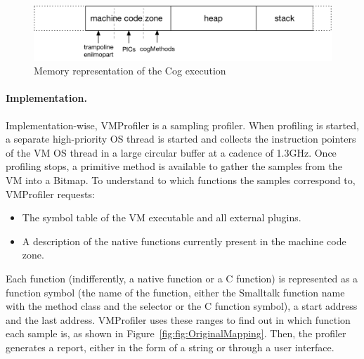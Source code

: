 \documentclass[10pt,preprint,nonatbib]{sigplanconf}
\newcommand{\figref}[1]{Figure~\ref{fig:#1}}
\begin{document}
 \begin{figure}[!htp]
     \begin{center}
         \includegraphics[width=1\linewidth]{CogMemory}
         \caption{Memory representation of the Cog execution}
         \label{fig:CogMemory}
     \end{center}
 \end{figure}

\paragraph{Implementation.} Implementation-wise, VMProfiler is a sampling profiler. When profiling is started, a separate high-priority OS thread is started and collects the instruction pointers of the VM OS thread in a large circular buffer at a cadence of 1.3GHz. Once profiling stops, a primitive method is available to gather the samples from the VM into a Bitmap. To understand to which functions the samples correspond to, VMProfiler requests:
\begin{itemize}
	\item The symbol table of the VM executable and all external plugins.
	\item A description of the native functions currently present in the machine code zone.
\end{itemize}
Each function (indifferently, a native function or a C function) is represented as a function symbol (the name of the function, either the Smalltalk function name with the method class and the selector or the C function symbol), a start address and the last address. VMProfiler uses these ranges to find out in which function each sample is, as shown in \figref{fig:OriginalMapping}. Then, the profiler generates a report, either in the form of a string or through a user interface.
\end{document}
